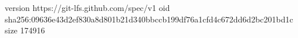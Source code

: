 version https://git-lfs.github.com/spec/v1
oid sha256:09636e43d2ef830a8d801b21d340bbccb199df76a1cfd4c672dd6d2bc201bd1c
size 174916

